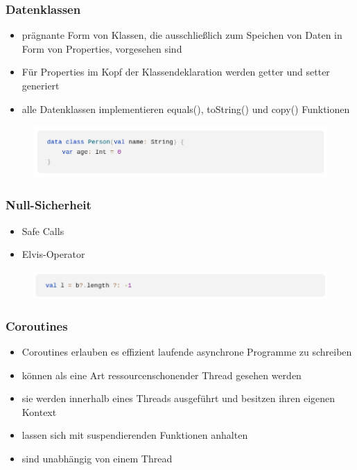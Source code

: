 \documentclass{beamer}
\begin{document}
\begin{frame}
\frametitle{Datenklassen}
\begin{itemize}
    \item prägnante Form von Klassen, die ausschließlich zum Speichen von Daten in Form von Properties, vorgesehen sind
    \item Für Properties im Kopf der Klassendeklaration werden getter und setter generiert
    \item alle Datenklassen implementieren equals(), toString() und copy() Funktionen
\end{itemize}
\begin{figure}[!htb]
    \centering
    \includegraphics[width=\linewidth]{images/Dataclass.png}
\end{figure}
\end{frame}

\begin{frame}
\frametitle{Null-Sicherheit}
\begin{itemize}
    \item Safe Calls
    \item Elvis-Operator
\end{itemize}
\begin{figure}[!htb]
    \centering
    \includegraphics[width=\linewidth]{images/Elvis_operator.png}
\end{figure}

\end{frame}

\begin{frame}
\frametitle{Coroutines}
\begin{itemize}
    \item Coroutines erlauben es effizient laufende asynchrone Programme zu schreiben
    \item können als eine Art ressourcenschonender Thread gesehen werden
    \item sie werden innerhalb eines Threads ausgeführt und besitzen ihren eigenen Kontext
    \item lassen sich mit suspendierenden Funktionen anhalten
    \item sind unabhängig von einem Thread
\end{itemize}
\end{frame}
\end{document}
